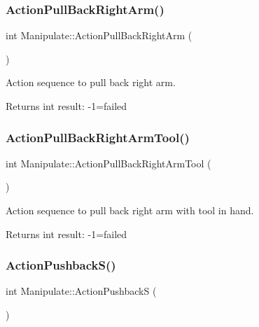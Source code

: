\subsubsection{\texorpdfstring{Action\+Pull\+Back\+Right\+Arm()}{ActionPullBackRightArm()}}
{\footnotesize\ttfamily int Manipulate\+::\+Action\+Pull\+Back\+Right\+Arm (\begin{DoxyParamCaption}{ }\end{DoxyParamCaption})\hspace{0.3cm}{\ttfamily [private]}}



Action sequence to pull back right arm. 

\begin{DoxyReturn}{Returns}
int result\+: -\/1=failed 
\end{DoxyReturn}
\mbox{\label{structManipulate_ae5d9a3633a709aee251e8f73126b7362}} 
\subsubsection{\texorpdfstring{Action\+Pull\+Back\+Right\+Arm\+Tool()}{ActionPullBackRightArmTool()}}
{\footnotesize\ttfamily int Manipulate\+::\+Action\+Pull\+Back\+Right\+Arm\+Tool (\begin{DoxyParamCaption}{ }\end{DoxyParamCaption})\hspace{0.3cm}{\ttfamily [private]}}



Action sequence to pull back right arm with tool in hand. 

\begin{DoxyReturn}{Returns}
int result\+: -\/1=failed 
\end{DoxyReturn}
\mbox{\label{structManipulate_a1caf8c447479cbcdc346b0959bd5100f}} 
\subsubsection{\texorpdfstring{Action\+Pushback\+S()}{ActionPushbackS()}}
{\footnotesize\ttfamily int Manipulate\+::\+Action\+PushbackS (\begin{DoxyParamCaption}{ }\end{DoxyParamCaption})\hspace{0.3cm}{\ttfamily [private]}}



